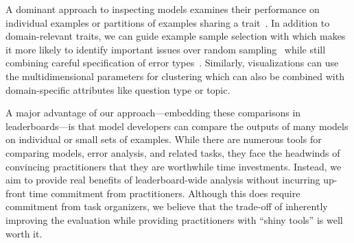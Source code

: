 A dominant approach to inspecting models examines their performance on individual examples or partitions of examples sharing a trait~\citep{wadhwa2018compare}.
In addition to domain-relevant traits, we can guide example sample selection with \irt{} which makes it more likely to identify important issues over random sampling~\citep{wadhwa2018compare} while still combining careful specification of error types~\citep{wu2019errudite}.
Similarly, visualizations can use the multidimensional \irt{} parameters for clustering which can also be combined with domain-specific attributes like question type or topic.

A major advantage of our approach---embedding these comparisons in leaderboards---is that model developers can compare the outputs of many models on individual or small sets of examples.
While there are numerous tools for comparing models, error analysis, and related tasks, they face the headwinds of convincing practitioners that they are worthwhile time investments.
Instead, we aim to provide real benefits of leaderboard-wide analysis without incurring up-front time commitment from practitioners.
Although this does require commitment from task organizers, we believe that the trade-off of inherently improving the evaluation while providing practitioners with ``shiny tools'' is well worth it.
